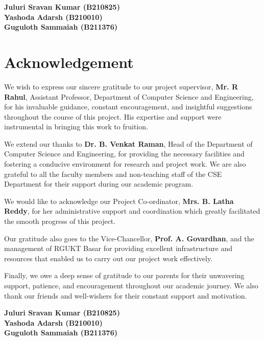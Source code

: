\documentclass[12pt, a4paper]{report}
\begin{document}
\vspace{3cm} %
\begin{flushright}
    \textbf{Juluri Sravan Kumar (B210825)}\\[1.5em] %
    \textbf{Yashoda Adarsh (B210010)}\\[1.5em]
    \textbf{Guguloth Sammaiah (B211376)}\\
\end{flushright}
\clearpage

\chapter*{Acknowledgement} %

We wish to express our sincere gratitude to our project supervisor, \textbf{Mr. R Rahul}, Assistant Professor, Department of Computer Science and Engineering, for his invaluable guidance, constant encouragement, and insightful suggestions throughout the course of this project. His expertise and support were instrumental in bringing this work to fruition.

We extend our thanks to \textbf{Dr. B. Venkat Raman}, Head of the Department of Computer Science and Engineering, for providing the necessary facilities and fostering a conducive environment for research and project work. We are also grateful to all the faculty members and non-teaching staff of the CSE Department for their support during our academic program.

We would like to acknowledge our Project Co-ordinator, \textbf{Mrs. B. Latha Reddy}, for her administrative support and coordination which greatly facilitated the smooth progress of this project.

Our gratitude also goes to the Vice-Chancellor, \textbf{Prof. A. Govardhan}, and the management of RGUKT Basar for providing excellent infrastructure and resources that enabled us to carry out our project work effectively.

Finally, we owe a deep sense of gratitude to our parents for their unwavering support, patience, and encouragement throughout our academic journey. We also thank our friends and well-wishers for their constant support and motivation.

\vspace{4cm} %

\begin{flushright} %
    \textbf{Juluri Sravan Kumar (B210825)}\\[1.5em]
    \textbf{Yashoda Adarsh (B210010)}\\[1.5em]
    \textbf{Guguloth Sammaiah (B211376)}\\
\end{flushright}
\clearpage
\end{document}
